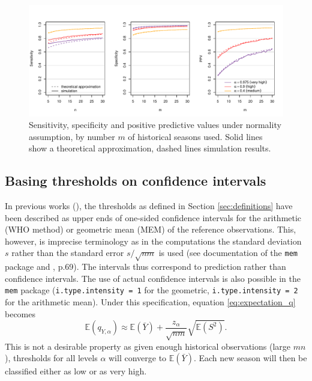 \documentclass{article}
\newcommand{\sd}{s}
\begin{document}
\begin{figure}
\begin{center}
\includegraphics[scale=0.75]{figure/analytical_sens_spec.pdf}
\end{center}

\vspace{-10mm}

\caption{Sensitivity, specificity and positive predictive values under normality assumption, by number $m$ of historical seasons used. Solid lines show a theoretical approximation, dashed lines simulation results.}
\label{fig:sens_spec_ana}
\end{figure}



\subsection{Basing thresholds on confidence intervals}
\label{subsec:cis}

In previous works (\citealt{WHO2014, Vega2015}), the thresholds as defined in Section \ref{sec:definitions} have been described as upper ends of one-sided confidence intervals for the arithmetic (WHO method) or geometric mean (MEM) of the reference observations. This, however, is imprecise terminology as in the computations the standard deviation $\sd$ rather than the standard error $\sd/\sqrt{nm}$ is used (see documentation of the \texttt{mem} package and \citealt{WHO2014}, p.69). The intervals thus correspond to prediction rather than confidence intervals. The use of actual confidence intervals is also possible in the \texttt{mem} package (\texttt{i.type.intensity = 1} for the geometric, \texttt{i.type.intensity = 2} for the arithmetic mean). Under this specification, equation \eqref{eq:expectation_q} becomes
$$
\mathbb{E}(q_{Y, \alpha}) \approx \mathbb{E}(\bar{Y}) + \frac{z_\alpha}{\sqrt{nm}} \sqrt{\mathbb{E}(S^2)}.
$$
This is not a desirable property as given enough historical observations (large $mn$), thresholds for all levels $\alpha$ will converge to $\mathbb{E}(\bar{Y})$. Each new season will then be classified either as low or as very high.
\end{document}
